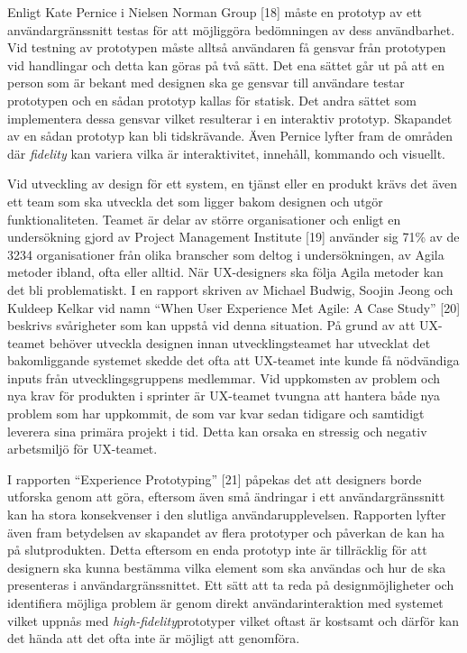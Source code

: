 \documentclass[12pt]{kththesis}
\begin{document}
Enligt Kate Pernice i Nielsen Norman Group [18] måste en prototyp av ett användargränssnitt testas för att möjliggöra bedömningen av dess användbarhet. Vid testning av prototypen måste alltså användaren få gensvar från prototypen vid handlingar och detta kan göras på två sätt. Det ena sättet går ut på att en person som är bekant med designen ska ge gensvar till användare testar prototypen och en sådan prototyp kallas för statisk. Det andra sättet som implementera dessa gensvar vilket resulterar i en interaktiv prototyp. Skapandet av en sådan prototyp kan bli tidskrävande. Även Pernice lyfter fram de områden där \textit{fidelity} kan variera vilka är interaktivitet, innehåll, kommando och visuellt. 

Vid utveckling av design för ett system, en tjänst eller en produkt krävs det även ett team som ska utveckla det som ligger bakom designen och utgör funktionaliteten. Teamet är delar av större organisationer och enligt en undersökning gjord av Project Management Institute [19] använder sig 71\% av de 3234 organisationer från olika branscher som deltog i undersökningen, av Agila metoder ibland, ofta eller alltid. När UX-designers ska följa Agila metoder kan det bli problematiskt. I en rapport skriven av Michael Budwig, Soojin Jeong och Kuldeep Kelkar vid namn “When User Experience Met Agile: A Case Study” [20] beskrivs svårigheter som kan uppstå vid denna situation. På grund av att UX-teamet behöver utveckla designen innan utvecklingsteamet har utvecklat det bakomliggande systemet skedde det ofta att UX-teamet inte kunde få nödvändiga inputs från utvecklingsgruppens medlemmar. Vid uppkomsten av problem och nya krav för produkten i sprinter är UX-teamet tvungna att hantera både nya problem som har uppkommit, de som var kvar sedan tidigare och samtidigt leverera sina primära projekt i tid. Detta kan orsaka en stressig och negativ arbetsmiljö för UX-teamet. 

I rapporten “Experience Prototyping” [21] påpekas det att designers borde utforska genom att göra, eftersom även små ändringar i ett användargränssnitt kan ha stora konsekvenser i den slutliga användarupplevelsen. Rapporten lyfter även fram betydelsen av skapandet av flera prototyper och påverkan de kan ha på slutprodukten. Detta eftersom en enda prototyp inte är tillräcklig för att designern ska kunna bestämma vilka element som ska användas och hur de ska presenteras i användargränssnittet. Ett sätt att ta reda på designmöjligheter och identifiera möjliga problem är genom direkt användarinteraktion med systemet vilket uppnås med \textit{high-fidelity}prototyper vilket oftast är kostsamt och därför kan det hända att det ofta inte är möjligt att genomföra.
\end{document}
